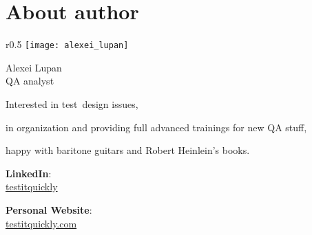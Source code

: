 \section*{About author}
\label{sec:About author}

\begingroup

	
	

\setlength{\intextsep}{-0.3em}
\setlength{\columnsep}{3em}

\begin{wrapfigure}[5]{r}{0.5\linewidth}
  \centering\texttt{[image: alexei\_lupan]}
\end{wrapfigure}

{\Large Alexei Lupan}\\
QA analyst

\setlength{\leftskip}{0.6em}

Interested in \mbox{test design} issues, 

in organization and providing full advanced trainings for new QA stuff,

happy with baritone guitars and Robert Heinlein's books.                                                                                                                                                                                                    

\setlength{\leftskip}{0em}

\textbf{LinkedIn}:\\
\href{https://www.linkedin.com/in/testitquickly/}{testitquickly}

\textbf{Personal Website}:\\
\href{https://testitquickly.com/}{testitquickly.com}

\endgroup
